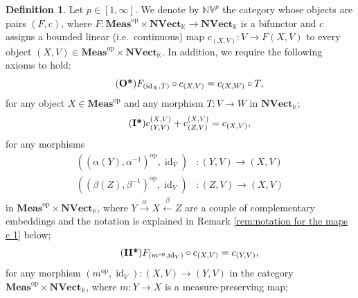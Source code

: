 \documentclass{amsart}
\theoremstyle{definition}
\newtheorem{definition}{Definition}[section]
\theoremstyle{plain}
\newcommand{\id}{\operatorname{id}}
\newcommand{\opMeas}{\mathbf{Meas}^\mathrm{op}}
\newcommand{\NVect}{\mathbf{NVect}_{\mathbb{K}}}
\newcommand{\NVp}{\mathbb{NV}^p}
\begin{document}
        \begin{definition}
        \label{def:NVp}
            Let $p \in [1,\infty]$. 
            We denote by $\NVp$ the category whose objects are pairs $(F,c)$, where $F \colon \opMeas \times \NVect \rightarrow \NVect$ is a bifunctor and $c$ assigns a bounded linear (i.e.~continuous) map $c_{(X,V)} \colon V \rightarrow F(X,V)$ to every object $(X,V) \in \opMeas \times \NVect$. 
            In addition, we require the following axioms to hold:
            \begin{equation}
            \tag{\textbf{O*}}
            \label{ax:compatibility with linear contractive maps 1}
                F_{(\id_X,T)} \circ c_{(X,V)} = c_{(X,W)} \circ T,
            \end{equation}            
            for any object $X \in \opMeas$ and any morphism $T \colon V \rightarrow W$ in $\NVect$;
            \begin{equation}
            \tag{\textbf{I*}}
            \label{ax:compatibility with complementary embeddings in the normed case 1}
                c_{(Y,V)}^{(X,V)} + c_{(Z,V)}^{(X,V)} = c_{(X,V)},
            \end{equation}
            for any morphisms 
            \begin{equation*}
                \begin{split}
                    \left( \left( \alpha(Y),\alpha^{-1} \right)^{\mathrm{op}},\id_V \right) &\colon (Y,V) \rightarrow (X,V) \\
                    \left( \left( \beta(Z),\beta^{-1} \right)^{\mathrm{op}},\id_V \right) &\colon (Z,V) \rightarrow (X,V)
                \end{split}
            \end{equation*}
            in $\opMeas \times \NVect$, where $Y \xrightarrow{~\alpha~} X \xleftarrow{~\beta~} Z$ are a couple of complementary embeddings and the notation is explained in Remark \ref{rem:notation for the maps c 1} below; 
            \begin{equation}
            \tag{\textbf{II*}} 
            \label{ax:compatibility with measure-preserving maps in the normed case}
                F_{(m^{\mathrm{op}},\id_V)} \circ c_{(X,V)} = c_{(Y,V)},
            \end{equation}
            for any morphism $(m^{\mathrm{op}},\id_V) \colon (X,V) \rightarrow (Y,V)$ in the category $\opMeas \times \NVect$, where $m \colon Y \rightarrow X$ is a measure-preserving map;
            \begin{equation} 

\end{equation}
\end{definition}
\end{document}
